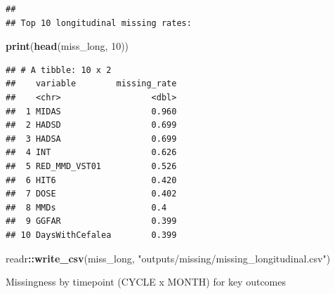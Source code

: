 \documentclass[
]{article}
\newenvironment{Shaded}{\begin{snugshade}}{\end{snugshade}}
\newcommand{\DecValTok}[1]{\textcolor[rgb]{0.00,0.00,0.81}{#1}}
\newcommand{\FunctionTok}[1]{\textcolor[rgb]{0.13,0.29,0.53}{\textbf{#1}}}
\newcommand{\NormalTok}[1]{#1}
\newcommand{\SpecialCharTok}[1]{\textcolor[rgb]{0.81,0.36,0.00}{\textbf{#1}}}
\newcommand{\StringTok}[1]{\textcolor[rgb]{0.31,0.60,0.02}{#1}}
\begin{document}
\begin{verbatim}
## 
## Top 10 longitudinal missing rates:
\end{verbatim}

\begin{Shaded}
\begin{Highlighting}[]
\FunctionTok{print}\NormalTok{(}\FunctionTok{head}\NormalTok{(miss\_long, }\DecValTok{10}\NormalTok{))}
\end{Highlighting}
\end{Shaded}

\begin{verbatim}
## # A tibble: 10 x 2
##    variable        missing_rate
##    <chr>                  <dbl>
##  1 MIDAS                  0.960
##  2 HADSD                  0.699
##  3 HADSA                  0.699
##  4 INT                    0.626
##  5 RED_MMD_VST01          0.526
##  6 HIT6                   0.420
##  7 DOSE                   0.402
##  8 MMDs                   0.4  
##  9 GGFAR                  0.399
## 10 DaysWithCefalea        0.399
\end{verbatim}

\begin{Shaded}
\begin{Highlighting}[]
\NormalTok{readr}\SpecialCharTok{::}\FunctionTok{write\_csv}\NormalTok{(miss\_long, }\StringTok{"outputs/missing/missing\_longitudinal.csv"}\NormalTok{)}
\end{Highlighting}
\end{Shaded}

Missingness by timepoint (CYCLE x MONTH) for key outcomes
\end{document}
